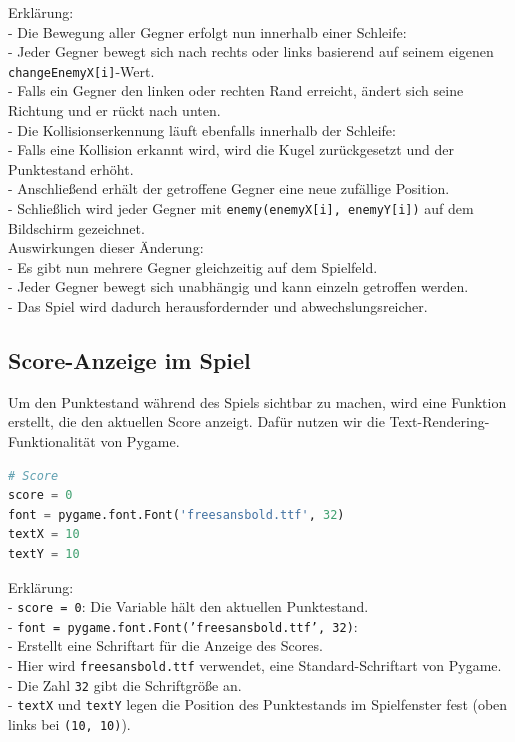 \documentclass{article}
\begin{document}
Erklärung:\\
- Die Bewegung aller Gegner erfolgt nun innerhalb einer Schleife:  \\
  - Jeder Gegner bewegt sich nach rechts oder links basierend auf seinem eigenen \texttt{changeEnemyX[i]}-Wert.\\
  - Falls ein Gegner den linken oder rechten Rand erreicht, ändert sich seine Richtung und er rückt nach unten.\\
- Die Kollisionserkennung läuft ebenfalls innerhalb der Schleife:\\
  - Falls eine Kollision erkannt wird, wird die Kugel zurückgesetzt und der Punktestand erhöht.\\
  - Anschließend erhält der getroffene Gegner eine neue zufällige Position.\\
- Schließlich wird jeder Gegner mit \texttt{enemy(enemyX[i], enemyY[i])} auf dem Bildschirm gezeichnet.\\

Auswirkungen dieser Änderung:\\
- Es gibt nun mehrere Gegner gleichzeitig auf dem Spielfeld.\\
- Jeder Gegner bewegt sich unabhängig und kann einzeln getroffen werden.\\
- Das Spiel wird dadurch herausfordernder und abwechslungsreicher.

\subsection{Score-Anzeige im Spiel}
Um den Punktestand während des Spiels sichtbar zu machen, wird eine Funktion erstellt, die den aktuellen Score anzeigt. Dafür nutzen wir die Text-Rendering-Funktionalität von Pygame.

\begin{lstlisting}[style=pythonstyle, language=Python]
# Score
score = 0
font = pygame.font.Font('freesansbold.ttf', 32)
textX = 10
textY = 10
\end{lstlisting}

Erklärung:\\
- \texttt{score = 0}: Die Variable hält den aktuellen Punktestand.\\
- \texttt{font = pygame.font.Font('freesansbold.ttf', 32)}:  \\
  - Erstellt eine Schriftart für die Anzeige des Scores.\\
  - Hier wird \texttt{freesansbold.ttf} verwendet, eine Standard-Schriftart von Pygame.\\
  - Die Zahl \texttt{32} gibt die Schriftgröße an.\\
- \texttt{textX} und \texttt{textY} legen die Position des Punktestands im Spielfenster fest (oben links bei \texttt{(10, 10)}).
\end{document}
